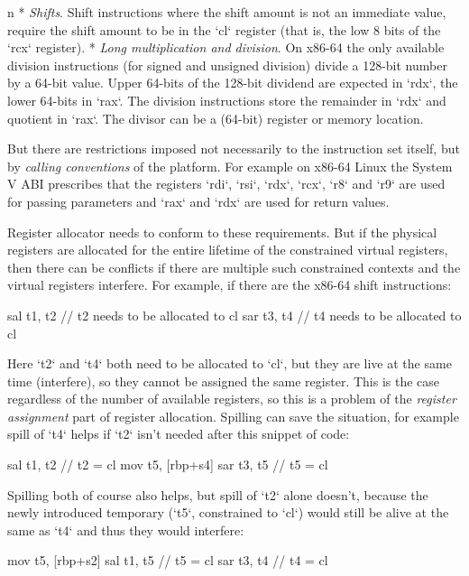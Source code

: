 \begitems\style n
* {\em Shifts}. Shift instructions where the shift amount is not an immediate
value, require the shift amount to be in the `cl` register (that is, the low 8
bits of the `rcx` register).
* {\em Long multiplication and division}. On x86-64 the only available
division instructions (for signed and unsigned division) divide a 128-bit number
by a 64-bit value.%
%
Upper 64-bits of the 128-bit dividend are expected in `rdx`,
the lower 64-bits in `rax`. The division instructions store the remainder in
`rdx` and quotient in `rax`. The divisor can be a (64-bit) register or memory
location.
\enditems

But there are restrictions imposed not necessarily to the instruction set
itself, but by {\em calling conventions} of the platform. For example on x86-64
Linux the System V ABI prescribes that the registers `rdi`, `rsi`, `rdx`, `rcx`,
`r8` and `r9` are used for passing parameters and `rax` and `rdx` are used for
return values.

Register allocator needs to conform to these requirements. But if the physical
registers are allocated for the entire lifetime of the constrained virtual
registers, then there can be conflicts if there are multiple such constrained
contexts and the virtual registers interfere. For example, if there are the
x86-64 shift instructions:

\begtt
sal t1, t2 // t2 needs to be allocated to cl
sar t3, t4 // t4 needs to be allocated to cl
\endtt

Here `t2` and `t4` both need to be allocated to `cl`, but they are live at the
same time (interfere), so they cannot be assigned the same register. This is the
case regardless of the number of available registers, so this is a problem of
the {\em register assignment} part of register allocation. Spilling can save the
situation, for example spill of `t4` helps if `t2` isn't needed after this
snippet of code:

\begtt
sal t1, t2 // t2 = cl
mov t5, [rbp+s4]
sar t3, t5 // t5 = cl
\endtt

Spilling both of course also helps, but spill of `t2` alone doesn't, because the
newly introduced temporary (`t5`, constrained to `cl`) would still be alive at the
same as `t4` and thus they would interfere:

\begtt
mov t5, [rbp+s2]
sal t1, t5 // t5 = cl
sar t3, t4 // t4 = cl
\endtt

